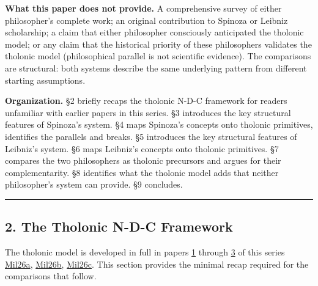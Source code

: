 \documentclass[
  11pt,
  letterpaper,
]{article}
\begin{document}
\textbf{What this paper does not provide.} A comprehensive survey of
either philosopher's complete work; an original contribution to Spinoza
or Leibniz scholarship; a claim that either philosopher consciously
anticipated the tholonic model; or any claim that the historical
priority of these philosophers validates the tholonic model
(philosophical parallel is not scientific evidence). The comparisons are
structural: both systems describe the same underlying pattern from
different starting assumptions.

\textbf{Organization.} §2 briefly recaps the tholonic N-D-C framework
for readers unfamiliar with earlier papers in this series. §3 introduces
the key structural features of Spinoza's system. §4 maps Spinoza's
concepts onto tholonic primitives, identifies the parallels and breaks.
§5 introduces the key structural features of Leibniz's system. §6 maps
Leibniz's concepts onto tholonic primitives. §7 compares the two
philosophers as tholonic precursors and argues for their
complementarity. §8 identifies what the tholonic model adds that neither
philosopher's system can provide. §9 concludes.

\begin{center}\rule{0.5\linewidth}{0.5pt}\end{center}

\subsection{2. The Tholonic N-D-C
Framework}\label{the-tholonic-n-d-c-framework}

The tholonic model is developed in full in papers
\href{https://github.com/baardev/truevalue/blob/main/docnav/Research/papers/1_recursive-tholonic-five-constants/1_recursive-tholonic-five-constants.pdf}{1}
through
\href{https://github.com/baardev/truevalue/blob/main/docnav/Research/papers/3_minimal-recursive-triadic-framework/3_minimal-recursive-triadic-framework.pdf}{3}
of this series
\href{https://github.com/baardev/truevalue/blob/main/docnav/Research/papers/1_recursive-tholonic-five-constants/1_recursive-tholonic-five-constants.pdf}{Mil26a},
\href{https://github.com/baardev/truevalue/blob/main/docnav/Research/papers/3_minimal-recursive-triadic-framework/3_minimal-recursive-triadic-framework.pdf}{Mil26b},
\href{https://github.com/baardev/truevalue/blob/main/docnav/Research/papers/6_qualitative-nature-integers-triadic-roles/6_qualitative-nature-integers-triadic-roles.pdf}{Mil26c}.
This section provides the minimal recap required for the comparisons
that follow.
\end{document}
